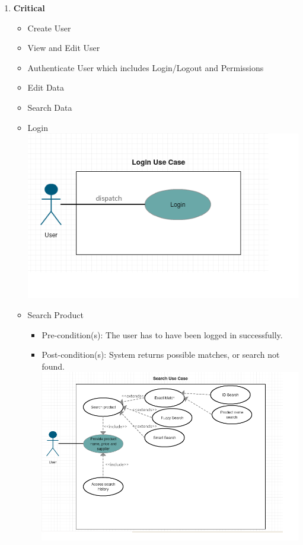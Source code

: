 \documentclass[a4paper,10pt]{article}
\begin{document}
		\begin{enumerate} 
		\item \textbf{Critical} 
		\begin{itemize}
		\item Create User
		\item View and Edit User
		\item Authenticate User which includes Login/Logout and Permissions
		\item Edit Data
		\item Search Data
		\end{itemize}
		
		\begin{itemize} 
			\item Login
			 \includegraphics[scale=0.62]{Diagrams/Login Use Case.png}\\
		 
			\item Search Product \\
			\begin{itemize}
				\item Pre-condition(s): The user has to have been logged in successfully.  \\
				\item Post-condition(s): System returns possible matches, or search not found. \\
 				\includegraphics[scale=0.35]{Diagrams/Search Use Case.png}
			\end{itemize}
			

\end{itemize}
\end{enumerate}
\end{document}
